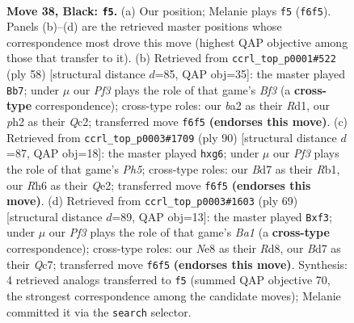 \documentclass[11pt]{article}
\begin{document}
\clearpage

\begin{figure}[p]\centering
\begin{subfigure}{0.46\textwidth}\centering
\resizebox{\linewidth}{!}{%
\newchessgame
\chessboard[
  setfen={3qn3/3b2k1/p4p1r/n3P2p/PQ1P2p1/N7/B4PPP/2R1K1N1 b - - 2 38},
  showmover=false,
  pgfstyle=straightmove, color=movearrow, markmove={f6-f5}
]}
\caption{}
\end{subfigure}\hfill
\begin{subfigure}{0.46\textwidth}\centering
\resizebox{\linewidth}{!}{%
\newchessgame
\chessboard[
  setfen={6kr/4b1p1/pn2q3/1p6/1Ppp1Bp1/2N2B2/P1Q2PP1/3R2K1 w - - 0 30},
  showmover=false,
  pgfstyle=straightmove, color=movearrow, markmove={f3-b7}
]}
\caption{}
\end{subfigure}
\\[4pt]
\begin{subfigure}{0.46\textwidth}\centering
\resizebox{\linewidth}{!}{%
\newchessgame
\chessboard[
  setfen={2b1r1k1/1n4q1/2pp2pp/p6P/P1P1p3/4N1P1/2B1QPK1/1R6 w - - 0 46},
  showmover=false,
  pgfstyle=straightmove, color=movearrow, markmove={h5-g6}
]}
\caption{}
\end{subfigure}\hfill
\begin{subfigure}{0.46\textwidth}\centering
\resizebox{\linewidth}{!}{%
\newchessgame
\chessboard[
  setfen={b2r2k1/2q2p2/1n2p1p1/RBp4p/8/1P3PP1/PNP4P/2K1Q3 b - - 0 35},
  showmover=false,
  pgfstyle=straightmove, color=movearrow, markmove={a8-f3}
]}
\caption{}
\end{subfigure}
\caption{\textbf{Move 38, Black: \texttt{f5}.} (a) Our position; Melanie plays \texttt{f5} (\texttt{f6f5}). Panels (b)--(d) are the retrieved master positions whose correspondence most drove this move (highest QAP objective among those that transfer to it). (b) Retrieved from \texttt{ccrl\_top\_p0001\#522} (ply 58) [structural distance $d$=85, QAP obj=35]: the master played \texttt{Bb7}; under $\mu$ our \emph{Pf3} plays the role of that game's \emph{Bf3} (a \textbf{cross-type} correspondence); cross-type roles: our \emph{b}a2 as their \emph{R}d1, our \emph{p}h2 as their \emph{Q}c2; transferred move \texttt{f6f5} \textbf{(endorses this move)}. (c) Retrieved from \texttt{ccrl\_top\_p0003\#1709} (ply 90) [structural distance $d$=87, QAP obj=18]: the master played \texttt{hxg6}; under $\mu$ our \emph{Pf3} plays the role of that game's \emph{Ph5}; cross-type roles: our \emph{B}d7 as their \emph{R}b1, our \emph{R}h6 as their \emph{Q}e2; transferred move \texttt{f6f5} \textbf{(endorses this move)}. (d) Retrieved from \texttt{ccrl\_top\_p0003\#1603} (ply 69) [structural distance $d$=89, QAP obj=13]: the master played \texttt{Bxf3}; under $\mu$ our \emph{Pf3} plays the role of that game's \emph{Ba1} (a \textbf{cross-type} correspondence); cross-type roles: our \emph{N}e8 as their \emph{R}d8, our \emph{B}d7 as their \emph{Q}c7; transferred move \texttt{f6f5} \textbf{(endorses this move)}. Synthesis: 4 retrieved analogs transferred to \texttt{f5} (summed QAP objective 70, the strongest correspondence among the candidate moves); Melanie committed it via the \texttt{search} selector.}
\label{fig:thought-m75}
\end{figure}
\end{document}
